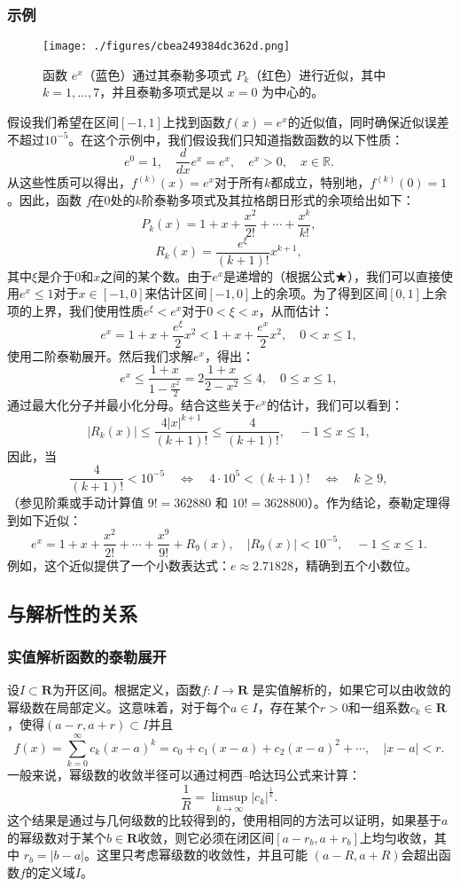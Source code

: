\subsubsection{示例}
\begin{figure}[ht]
\centering
\texttt{[image: ./figures/cbea249384dc362d.png]}
\caption{函数 \( e^x \)（蓝色）通过其泰勒多项式 \( P_k \)（红色）进行近似，其中 \( k = 1, \ldots, 7 \)，并且泰勒多项式是以 \( x = 0 \) 为中心的。} \label{fig_TLGS_5}
\end{figure}
假设我们希望在区间\( [-1, 1] \)上找到函数\( f(x) = e^x \)的近似值，同时确保近似误差不超过\( 10^{-5} \)。在这个示例中，我们假设我们只知道指数函数的以下性质：
\[
e^0 = 1, \quad \frac{d}{dx} e^x = e^x, \quad e^x > 0, \quad x \in \mathbb{R}.~
\]
从这些性质可以得出，\( f^{(k)}(x) = e^x \)对于所有\( k \)都成立，特别地，\( f^{(k)}(0) = 1 \)。因此，函数 \( f \)在\( 0 \)处的\( k \)阶泰勒多项式及其拉格朗日形式的余项给出如下：
\[
P_k(x) = 1 + x + \frac{x^2}{2!} + \cdots + \frac{x^k}{k!},~
\]
\[
R_k(x) = \frac{e^\xi}{(k+1)!} x^{k+1},~
\]
其中\( \xi \)是介于\( 0 \)和\( x \)之间的某个数。由于\( e^x \)是递增的（根据公式★），我们可以直接使用\( e^x \leq 1 \)对于\( x \in [-1, 0] \)来估计区间\( [-1, 0] \)上的余项。为了得到区间\( [0, 1] \)上余项的上界，我们使用性质\( e^\xi < e^x \)对于\( 0 < \xi < x \)，从而估计：
\[
e^x = 1 + x + \frac{e^\xi}{2} x^2 < 1 + x + \frac{e^x}{2} x^2, \quad 0 < x \leq 1,~
\]
使用二阶泰勒展开。然后我们求解\( e^x \)，得出：
\[
e^x \leq \frac{1 + x}{1 - \frac{x^2}{2}} = 2 \frac{1 + x}{2 - x^2} \leq 4, \quad 0 \leq x \leq 1,~
\]
通过最大化分子并最小化分母。结合这些关于\( e^x \)的估计，我们可以看到：
\[
|R_k(x)| \leq \frac{4 |x|^{k+1}}{(k+1)!} \leq \frac{4}{(k+1)!}, \quad -1 \leq x \leq 1,~
\]
因此，当
\[
\frac{4}{(k+1)!} < 10^{-5} \quad \Longleftrightarrow \quad 4 \cdot 10^5 < (k+1)! \quad \Longleftrightarrow \quad k \geq 9,~
\]
（参见阶乘或手动计算值 \( 9! = 362880 \) 和 \( 10! = 3628800 \)）。作为结论，泰勒定理得到如下近似：
\[
e^x = 1 + x + \frac{x^2}{2!} + \cdots + \frac{x^9}{9!} + R_9(x), \quad |R_9(x)| < 10^{-5}, \quad -1 \leq x \leq 1.~
\]
例如，这个近似提供了一个小数表达式：\(e \approx 2.71828\)，精确到五个小数位。
\subsection{与解析性的关系}  
\subsubsection{实值解析函数的泰勒展开}  
设\( I \subset \mathbf{R} \)为开区间。根据定义，函数\( f : I \to \mathbf{R} \) 是实值解析的，如果它可以由收敛的幂级数在局部定义。这意味着，对于每个\( a \in I \)，存在某个\( r > 0 \)和一组系数\( c_k \in \mathbf{R}\)，使得\( (a - r, a + r) \subset I \)并且
\[
f(x) = \sum_{k=0}^{\infty} c_k (x - a)^k = c_0 + c_1 (x - a) + c_2 (x - a)^2 + \cdots, \quad |x - a| < r.~
\]
一般来说，幂级数的收敛半径可以通过柯西–哈达玛公式来计算：
\[
\frac{1}{R} = \limsup_{k \to \infty} |c_k|^{\frac{1}{k}}.~
\]
这个结果是通过与几何级数的比较得到的，使用相同的方法可以证明，如果基于\( a \)的幂级数对于某个\( b \in \mathbf{R}\)收敛，则它必须在闭区间\( [a - r_b, a + r_b] \)上均匀收敛，其中 \( r_b = |b - a| \)。这里只考虑幂级数的收敛性，并且可能 \( (a - R, a + R) \)会超出函数\( f \)的定义域\( I \)。

